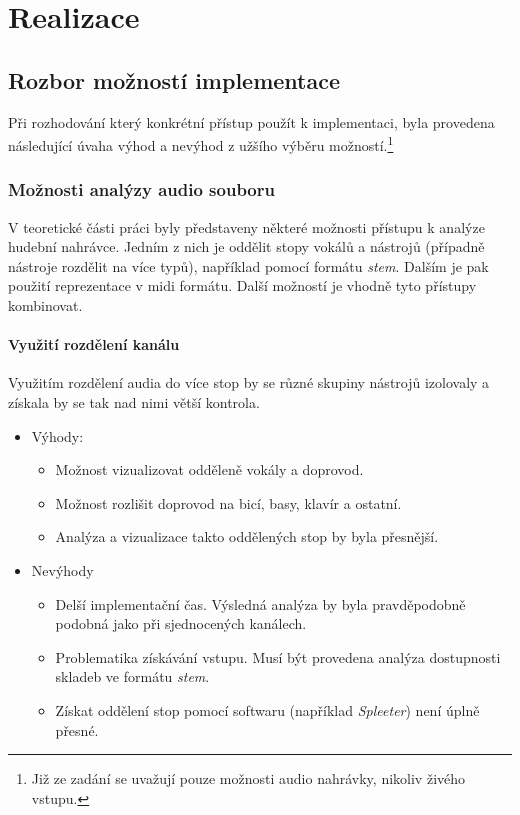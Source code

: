 \documentclass[thesis=B, czech]{FITthesis}[2019/03/06]
\begin{document}

\part{Realizace}

\chapter{Rozbor možností implementace}

Při rozhodování který konkrétní přístup použít k implementaci, byla provedena následující úvaha výhod a nevýhod z užšího výběru možností.\footnote{Již ze zadání se uvažují pouze možnosti audio nahrávky, nikoliv živého vstupu.}

\section{Možnosti analýzy audio souboru}

V teoretické části práci byly představeny některé možnosti přístupu k analýze hudební nahrávce. Jedním z nich je oddělit stopy vokálů a nástrojů (případně nástroje rozdělit na více typů), například pomocí formátu \textit{stem}. Dalším je pak použití reprezentace v \gls{midi} formátu. Další možností je vhodně tyto přístupy kombinovat.

\subsection*{Využití rozdělení kanálu}

Využitím rozdělení audia do více stop by se různé skupiny nástrojů izolovaly a získala by se tak nad nimi větší kontrola.

\begin{itemize}
    \item Výhody:
        \begin{itemize}
            \item Možnost vizualizovat odděleně vokály a doprovod. 
            \item Možnost rozlišit doprovod na bicí, basy, klavír a ostatní.
            \item Analýza a vizualizace takto oddělených stop by byla přesnější.
        \end{itemize}
    \item Nevýhody
        \begin{itemize}
            \item Delší implementační čas. Výsledná analýza by byla pravděpodobně podobná jako při sjednocených kanálech.
            \item Problematika získávání vstupu. Musí být provedena analýza dostupnosti skladeb ve formátu \textit{stem}.
            \item Získat oddělení stop pomocí softwaru (například \textit{Spleeter}) není úplně přesné.
        \end{itemize}
\end{itemize}
\end{document}
